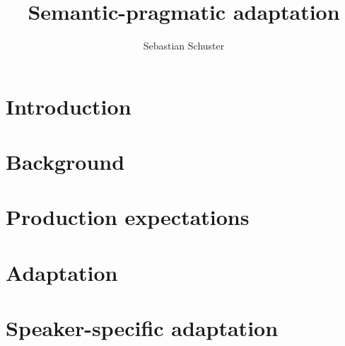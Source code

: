\documentclass[12pt]{report}
\title{Semantic-pragmatic adaptation}
\author{Sebastian Schuster}
\begin{document}

    \beforepreface



    

    


    \afterpreface
 
    \chapter{Introduction}
    

    \chapter{Background}
    

    \chapter{Production expectations}
    

    \chapter{Adaptation}
    

    \chapter{Speaker-specific adaptation}
    
\end{document}
